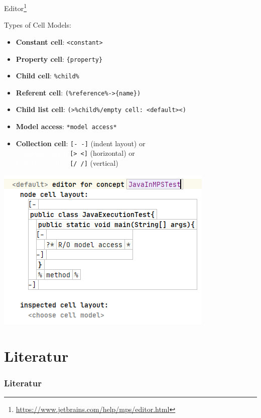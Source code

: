 	\begin{frame}{Editor\footnote{\url{https://www.jetbrains.com/help/mps/editor.html}}}
		\begin{minipage}{0.52\textwidth}
			Types of Cell Models:
			\begin{itemize}
				\item \textbf{Constant cell}: \texttt{<constant>}
				\item \textbf{Property cell}: \texttt{\{property\}}
				\item \textbf{Child cell}: \texttt{\%child\%}
				\item \textbf{Referent cell}: \texttt{(\%reference\%->\{name\})}
				\item \textbf{Child list cell}: \texttt{(>\%child\%/empty cell: <default><)}
				\item \textbf{Model access}: \texttt{*model access*}
				\item \textbf{Collection cell}: \texttt{[- -]} (indent layout) or \\
				\textcolor{white}{Collection cell: n} \texttt{[> <]} (horizontal) or \\
				\textcolor{white}{Collection cell: n} \texttt{[/ /]} (vertical) 
			\end{itemize}
		\end{minipage}
	\begin{minipage}{0.4\textwidth}
		\includegraphics[height=0.8\textheight]{illustrations/editor.png}
	\end{minipage}
	\end{frame}

    \section{Literatur}

    \begin{frame}[t, allowframebreaks]
        \frametitle{Literatur}
        \printbibliography
    \end{frame}


